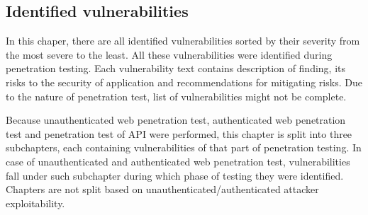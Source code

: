 \newpage
\subsection{Identified vulnerabilities}
In this chaper, there are all identified vulnerabilities sorted by their severity from the most severe to the least. All these vulnerabilities were identified during penetration testing. Each vulnerability text contains description of finding, its risks to the security of application and recommendations for mitigating risks. Due to the nature of penetration test, list of vulnerabilities might not be complete.

Because unauthenticated web penetration test, authenticated web penetration test and penetration test of API were performed, this chapter is split into three subchapters, each containing vulnerabilities of that part of penetration testing. In case of unauthenticated and authenticated web penetration test, vulnerabilities fall under such subchapter during which phase of testing they were identified. Chapters are not split based on unauthenticated/authenticated attacker exploitability.
